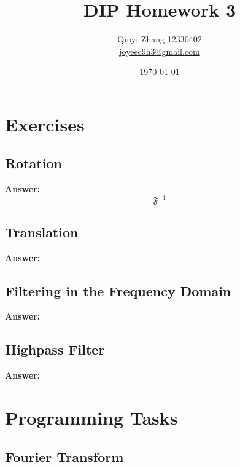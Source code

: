 \documentclass{article}
\begin{document}
\title{DIP Homework 3}
\author{Qiuyi Zhang 12330402 \\ \href{mailto:joyeec9h3@gmail.com}{joyeec9h3@gmail.com}} 
\date{\today}
\maketitle
\tableofcontents
\section{Exercises}

\subsection{Rotation}

\textbf{Answer:} 
$$\mathfrak{F}^{-1}$$

\subsection{Translation}

\textbf{Answer:}

\subsection{Filtering in the Frequency Domain}

\textbf{Answer:}

\subsection{Highpass Filter}

\textbf{Answer:}

\section{Programming Tasks}
\subsection{Fourier Transform}
\end{document}
